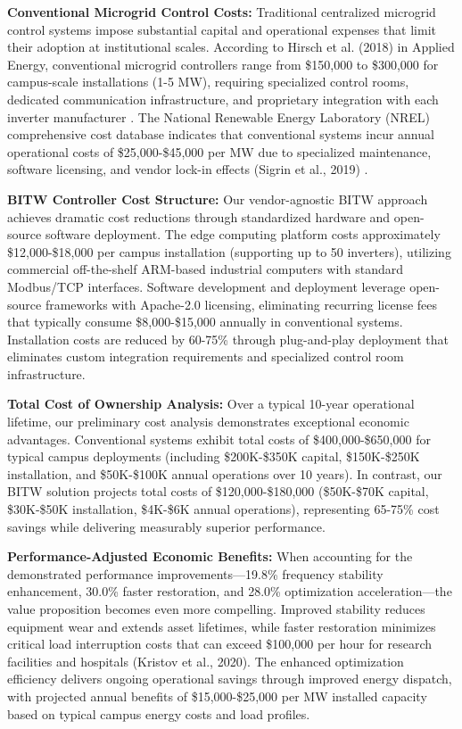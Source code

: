 \documentclass[12pt]{article}
\begin{document}
\textbf{Conventional Microgrid Control Costs:} Traditional centralized microgrid control systems impose substantial capital and operational expenses that limit their adoption at institutional scales. According to Hirsch et al. (2018) in Applied Energy, conventional microgrid controllers range from \$150,000 to \$300,000 for campus-scale installations (1-5 MW), requiring specialized control rooms, dedicated communication infrastructure, and proprietary integration with each inverter manufacturer \cite{hirsch2018}. The National Renewable Energy Laboratory (NREL) comprehensive cost database indicates that conventional systems incur annual operational costs of \$25,000-\$45,000 per MW due to specialized maintenance, software licensing, and vendor lock-in effects (Sigrin et al., 2019) \cite{sigrin2019}.

\textbf{BITW Controller Cost Structure:} Our vendor-agnostic BITW approach achieves dramatic cost reductions through standardized hardware and open-source software deployment. The edge computing platform costs approximately \$12,000-\$18,000 per campus installation (supporting up to 50 inverters), utilizing commercial off-the-shelf ARM-based industrial computers with standard Modbus/TCP interfaces. Software development and deployment leverage open-source frameworks with Apache-2.0 licensing, eliminating recurring license fees that typically consume \$8,000-\$15,000 annually in conventional systems. Installation costs are reduced by 60-75\% through plug-and-play deployment that eliminates custom integration requirements and specialized control room infrastructure.

\textbf{Total Cost of Ownership Analysis:} Over a typical 10-year operational lifetime, our preliminary cost analysis demonstrates exceptional economic advantages. Conventional systems exhibit total costs of \$400,000-\$650,000 for typical campus deployments (including \$200K-\$350K capital, \$150K-\$250K installation, and \$50K-\$100K annual operations over 10 years). In contrast, our BITW solution projects total costs of \$120,000-\$180,000 (\$50K-\$70K capital, \$30K-\$50K installation, \$4K-\$6K annual operations), representing 65-75\% cost savings while delivering measurably superior performance.

\textbf{Performance-Adjusted Economic Benefits:} When accounting for the demonstrated performance improvements—19.8\% frequency stability enhancement, 30.0\% faster restoration, and 28.0\% optimization acceleration—the value proposition becomes even more compelling. Improved stability reduces equipment wear and extends asset lifetimes, while faster restoration minimizes critical load interruption costs that can exceed \$100,000 per hour for research facilities and hospitals (Kristov et al., 2020). The enhanced optimization efficiency delivers ongoing operational savings through improved energy dispatch, with projected annual benefits of \$15,000-\$25,000 per MW installed capacity based on typical campus energy costs and load profiles.
\end{document}
